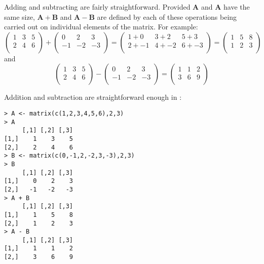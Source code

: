 
 Adding and subtracting are fairly straightforward.   Provided $\boldsymbol{A}$ and $\boldsymbol{A}$ have the same size, $\boldsymbol{A} + \boldsymbol{B}$ and $\boldsymbol{A} - \boldsymbol{B}$ are defined by each of these operations being carried out on individual elements of the matrix.   For example:
\begin{displaymath}
\left( \begin{array}{rrr}
1 & 3 & 5\\
2 & 4 &  6\\
\end{array}
\right)
+
\left( \begin{array}{rrr}
0 & 2 & 3\\
-1 & -2 &  -3\\
\end{array}
\right)
=
\left( \begin{array}{rrr}
1 + 0 & 3 + 2 & 5 + 3\\
2 + -1 & 4 + -2 &  6 + -3\\
\end{array}
\right) = 
\left( \begin{array}{rrr}
1 & 5 & 8\\
1 & 2 &  3\\
\end{array}
\right)
\end{displaymath}
and
\begin{displaymath}
\left( \begin{array}{rrr}
1 & 3 & 5\\
2 & 4 &  6\\
\end{array}
\right)
-
\left( \begin{array}{rrr}
0 & 2 & 3\\
-1 & -2 &  -3\\
\end{array}
\right)
=
\left( \begin{array}{rrr}
1 & 1 & 2\\
3 & 6 &  9\\
\end{array}
\right)
\end{displaymath}


Addition and subtraction are straightforward enough in \R:
\singlespacing
\begin{verbatim}
> A <- matrix(c(1,2,3,4,5,6),2,3)
> A
     [,1] [,2] [,3]
[1,]    1    3    5
[2,]    2    4    6
> B <- matrix(c(0,-1,2,-2,3,-3),2,3)
> B
     [,1] [,2] [,3]
[1,]    0    2    3
[2,]   -1   -2   -3
> A + B
     [,1] [,2] [,3]
[1,]    1    5    8
[2,]    1    2    3
> A - B
     [,1] [,2] [,3]
[1,]    1    1    2
[2,]    3    6    9
\end{verbatim}
\onehalfspacing

